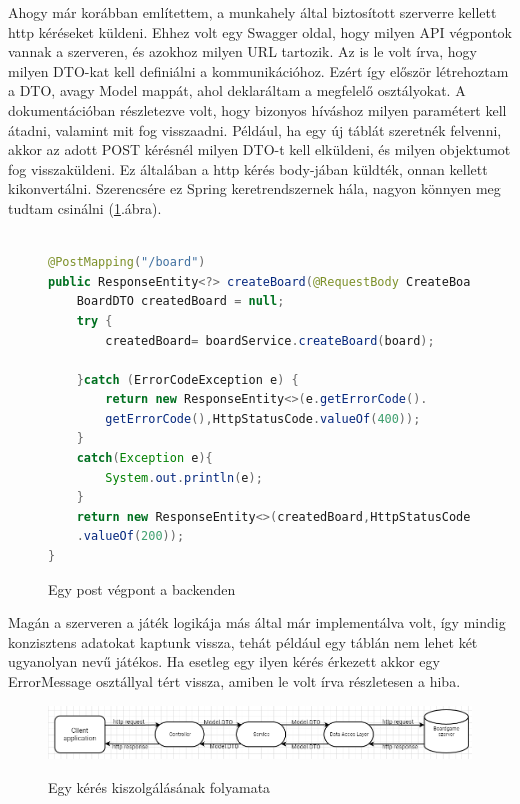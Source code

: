 \documentclass[a4paper,twoside]{article}
\begin{document}
Ahogy már korábban említettem, a munkahely által biztosított szerverre kellett http kéréseket
küldeni. Ehhez volt egy Swagger\cite{swagger} oldal, hogy milyen API végpontok vannak a szerveren, és
azokhoz milyen URL tartozik.  Az is le volt írva, hogy milyen DTO-kat kell definiálni a
kommunikációhoz. Ezért így először létrehoztam a DTO, avagy Model mappát, ahol deklaráltam a
megfelelő osztályokat. A dokumentációban részletezve volt, hogy bizonyos híváshoz milyen
paramétert kell átadni, valamint mit fog visszaadni. Például, ha egy új táblát szeretnék
felvenni, akkor az adott POST kérésnél milyen DTO-t kell elküldeni, és milyen objektumot
fog visszaküldeni. Ez általában a http kérés body-jában küldték, onnan kellett kikonvertálni. Szerencsére ez Spring keretrendszernek hála, nagyon könnyen meg tudtam csinálni (\ref{post-vegpont}.ábra).
\begin{figure}
	\caption{Egy post végpont a backenden}
	

	\begin{minipage}{\textwidth}
	\begin{lstlisting}[language=java,breaklines=true]
		
@PostMapping("/board")
public ResponseEntity<?> createBoard(@RequestBody CreateBoardDTO board) {
	BoardDTO createdBoard = null;
	try {
		createdBoard= boardService.createBoard(board);
		
	}catch (ErrorCodeException e) {
		return new ResponseEntity<>(e.getErrorCode().
		getErrorCode(),HttpStatusCode.valueOf(400));
	}
	catch(Exception e){
		System.out.println(e);
	}
	return new ResponseEntity<>(createdBoard,HttpStatusCode
	.valueOf(200));
}
	\end{lstlisting}
\end{minipage}

	\label{post-vegpont}
\end{figure} 

Magán a szerveren a játék logikája más által már implementálva volt, így mindig
konzisztens adatokat kaptunk vissza, tehát például egy táblán nem lehet két ugyanolyan nevű
játékos. Ha esetleg egy ilyen kérés érkezett akkor egy ErrorMessage osztállyal tért vissza,
amiben le volt írva részletesen a hiba.

\begin{figure}
	\caption{Egy kérés kiszolgálásának folyamata}
	\raggedleft 
	\includegraphics[scale=0.45]{backend-pipeline}
	\label{backend-pipeline}
\end{figure}
\end{document}
